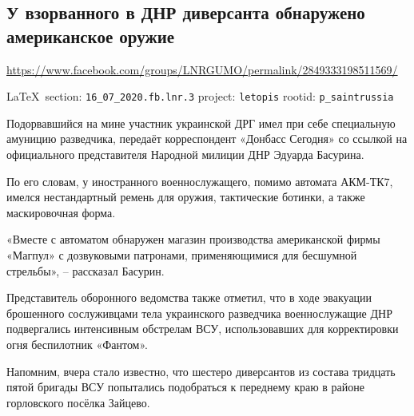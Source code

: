  
 
\subsection{У взорванного в ДНР диверсанта обнаружено американское оружие}
\url{https://www.facebook.com/groups/LNRGUMO/permalink/2849333198511569/}
  
\vspace{0.5cm}
{\small\LaTeX~section: \verb|16_07_2020.fb.lnr.3| project: \verb|letopis| rootid: \verb|p_saintrussia|}
\vspace{0.5cm}
  
Подорвавшийся на мине участник украинской ДРГ имел при себе специальную амуницию разведчика, передаёт корреспондент «Донбасс Сегодня» со ссылкой на официального представителя Народной милиции ДНР Эдуарда Басурина.

По его словам, у иностранного военнослужащего, помимо автомата АКМ-ТК7, имелся нестандартный ремень для оружия, тактические ботинки, а также маскировочная форма.

«Вместе с автоматом обнаружен магазин производства американской фирмы «Магпул» с дозвуковыми патронами, применяющимися для бесшумной стрельбы», – рассказал Басурин.

Представитель оборонного ведомства также отметил, что в ходе эвакуации брошенного сослуживцами тела украинского разведчика военнослужащие ДНР подвергались интенсивным обстрелам ВСУ, использовавших для корректировки огня беспилотник «Фантом».

Напомним, вчера стало известно, что шестеро диверсантов из состава тридцать пятой бригады ВСУ попытались подобраться к переднему краю в районе горловского посёлка Зайцево.
